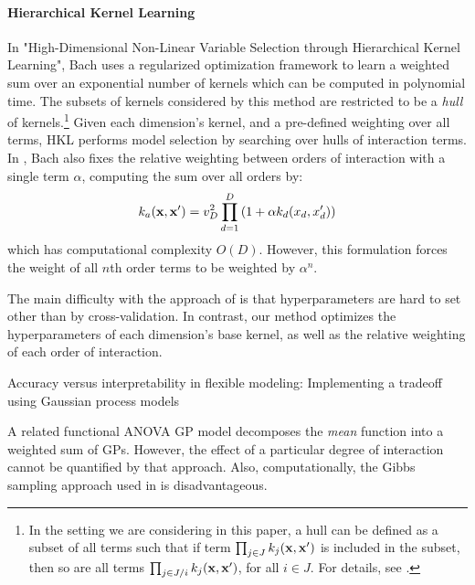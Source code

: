\documentclass[twoside]{article}
\begin{document}
\paragraph{Hierarchical Kernel Learning}

In "High-Dimensional Non-Linear Variable Selection through Hierarchical Kernel Learning", Bach\cite{DBLP:journals/corr/abs-0909-0844} uses a regularized optimization framework to learn a weighted sum over an exponential number of kernels which can be computed in polynomial time.  The subsets of kernels considered by this method are restricted to be a \textit{hull} of kernels.\footnote{In the setting we are considering in this paper, a hull can be defined as a subset of all terms such that if term $\prod_{j \in J} k_j(\bf x, x')$ is included in the subset, then so are all terms $\prod_{j \in J / i} k_j(\bf x, x')$, for all $i \in J$.  For details, see \cite{DBLP:journals/corr/abs-0909-0844}.}
Given each dimension's kernel, and a pre-defined weighting over all terms, HKL performs model selection by searching over hulls of interaction terms.
In \cite{DBLP:journals/corr/abs-0909-0844}, Bach also fixes the relative weighting between orders of interaction with a single term $\alpha$, computing the sum over all orders by:
\begin{equation}
\label{eqn:uniform}
k_{a}({\bf x, x'}) = v_D^2 \prod_{d=1}^D \left(1 + \alpha k_{d}(x_{d}, x_{d}') \right)
\end{equation}
which has computational complexity $O(D)$.  However, this formulation forces the weight of all $n$th order terms to be weighted by $\alpha^n$.

The main difficulty with the approach of \cite{DBLP:journals/corr/abs-0909-0844} is that hyperparameters are hard to set other than by cross-validation.  In contrast, our method optimizes the hyperparameters of each dimension's base kernel, as well as the relative weighting of each order of interaction. 

Accuracy versus interpretability in flexible modeling: Implementing a tradeoff using Gaussian process models \cite{plate1999accuracy}

A related functional ANOVA GP model\cite{kaufman2010bayesian} decomposes the \emph{mean} function into a weighted sum of GPs. However, the effect of a particular degree of interaction cannot be quantified by that approach. Also, computationally, the Gibbs sampling approach used in \cite{kaufman2010bayesian} is disadvantageous.
\end{document}
